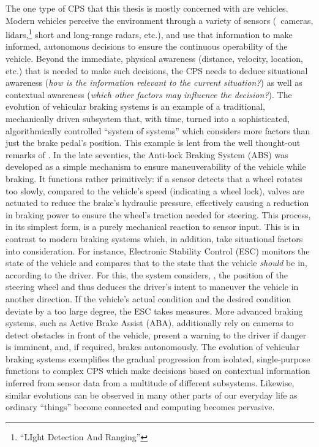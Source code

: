 The one type of CPS that this thesis is mostly concerned with are vehicles. Modern vehicles perceive the environment through a variety of sensors (\eg\ cameras, lidars,\footnote{``LIght Detection And Ranging''} short and long-range radars, etc.), and use that information to make informed, autonomous decisions to ensure the continuous operability of the vehicle.
Beyond the immediate, physical awareness (distance, velocity, location, etc.) that is needed to make such decisions, the CPS needs to deduce situational awareness (\emph{how is the information relevant to the current situation?}) as well as contextual awareness (\emph{which other factors may influence the decision?}).
The evolution of vehicular braking systems is an example of a traditional, mechanically driven subsystem that, with time, turned into a sophisticated, algorithmically controlled ``system of systems'' which considers more factors than just the brake pedal's position. This example is lent from the well thought-out remarks of \citeauthor{broy2012cyber} \cite{broy2012cyber}.
In the late seventies, the Anti-lock Braking System (ABS) was developed as a simple mechanism to ensure maneuverability of the vehicle while braking. It functions rather primitively: if a sensor detects that a wheel rotates too slowly, compared to the vehicle's speed (indicating a wheel lock), valves are actuated to reduce the brake's hydraulic pressure, effectively causing a reduction in braking power to ensure the wheel's traction needed for steering. This process, in its simplest form, is a purely mechanical reaction to sensor input.
This is in contrast to modern braking systems which, in addition, take situational factors into consideration. For instance, Electronic Stability Control (ESC) monitors the state of the vehicle and compares that to the state that the vehicle \emph{should} be in, according to the driver. For this, the system considers, \eg , the position of the steering wheel and thus deduces the driver's intent to maneuver the vehicle in another direction. If the vehicle's actual condition and the desired condition deviate by a too large degree, the ESC takes measures. More advanced braking systems, such as Active Brake Assist (ABA), additionally rely on cameras to detect obstacles in front of the vehicle, present a warning to the driver if danger is imminent, and, if required, brakes autonomously.
The evolution of vehicular braking systems exemplifies the gradual progression from isolated, single-purpose functions to complex CPS which make decisions based on contextual information inferred from sensor data from a multitude of different subsystems. Likewise, similar evolutions can be observed in many other parts of our everyday life as ordinary ``things'' become connected and computing becomes pervasive.

